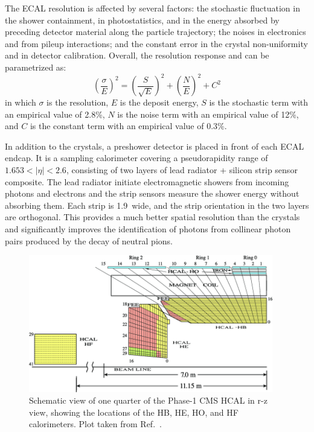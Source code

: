 The ECAL resolution is affected by several factors: 
the stochastic fluctuation in the shower containment, in photostatistics, and in the energy absorbed by preceding detector material along the particle trajectory; 
the noises in electronics and from pileup interactions;
and the constant error in the crystal non-uniformity and in detector calibration.
Overall, the resolution response and can be parametrized as:
\begin{equation}\label{eq:ecal_reso}
    ( \frac{\sigma}{E} )^{2} = ( \frac{S}{\sqrt{E}} )^{2} + ( \frac{N}{E} )^{2} + C^{2}
\end{equation}
in which $\sigma$ is the resolution, $E$ is the deposit energy,
$S$ is the stochastic term with an empirical value of 2.8\%, 
$N$ is the noise term with an empirical value of 12\%,
and $C$ is the constant term with an empirical value of 0.3\%.

In addition to the crystals, a preshower detector is placed in front of each ECAL endcap. 
It is a sampling calorimeter covering a pseudorapidity range of $1.653 < |\eta| < 2.6$, 
consisting of two layers of lead radiator + silicon strip sensor composite. 
The lead radiator initiate electromagnetic showers from incoming photons and electrons and the strip sensors measure the shower energy without absorbing them.
Each strip is 1.9~\mm wide, and the strip orientation in the two layers are orthogonal.
This provides a much better spatial resolution than the crystals and significantly improves the 
identification of photons from collinear photon pairs produced by the decay of neutral pions.


\begin{figure}[!htb]
    \centering
    \captionsetup{justification=justified}
    \includegraphics[width=0.95\textwidth]{pics/LHC_CMS/HCAL.png}
    \caption{Schematic view of one quarter of the Phase-1 CMS HCAL in r-z view,
             showing the locations of the HB, HE, HO, and HF calorimeters.
             Plot taken from Ref.~\cite{Mans:1481837}.}
    \label{fig:cms_hcal}
\end{figure}

